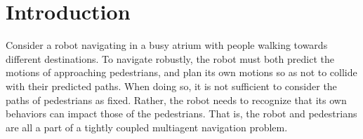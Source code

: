 \documentclass[conference]{IEEEtran}
\begin{document}

\section{Introduction}
\vspace{-0.3em}
\label{sec:intro}
\noindent

Consider a robot navigating in a busy atrium with people walking
towards different destinations. 
To navigate robustly, the robot must both predict the motions of approaching pedestrians, and plan its own motions so as not to collide with their predicted paths.
When doing so, it is not sufficient to consider the paths of pedestrians as 
fixed.  Rather, the robot needs to recognize that its own behaviors can 
impact those of the pedestrians. That is, the robot and pedestrians are all a 
part of a tightly coupled multiagent navigation 
problem. 



\end{document}
